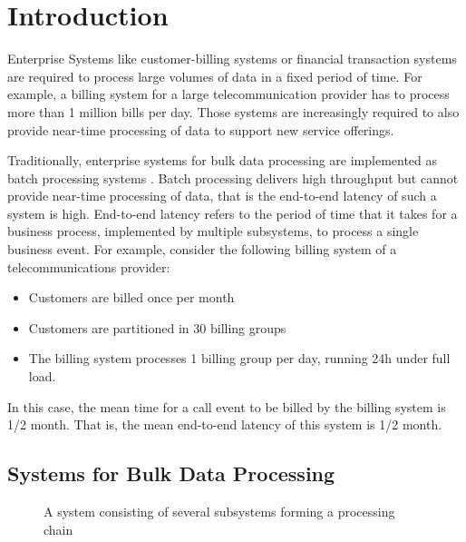 \chapter{Introduction}\label{ch:introduction}

Enterprise Systems like customer-billing systems or financial transaction systems are required to process large volumes of data in a fixed period of time. For example, a billing system for a large telecommunication provider has to process more than 1 million bills per day.
Those systems are increasingly required to also provide near-time processing of data to support new service offerings.

Traditionally, enterprise systems for bulk data processing are implemented as batch processing systems \citep{Fleck:1999aa}. Batch processing delivers high throughput but cannot provide near-time processing of data, that is the end-to-end latency of such a system is high. End-to-end latency refers to the period of time that it takes for a business process, implemented by multiple subsystems, to process a single business event.  For example, consider the following billing system of a telecommunications provider:
\begin{itemize}
	\item Customers are billed once per month
	\item Customers are partitioned in 30 billing groups
	\item The billing system processes 1 billing group per day, running 24h under full load.
\end{itemize}
In this case, the mean time for a call event to be billed by the billing system is 1/2 month. That is, the mean end-to-end latency of this system is 1/2 month.

\section{Systems for Bulk Data Processing}

\begin{figure}[h!tbp]
	\centering
	\mbox{}
	\mbox{}
	\caption{A system consisting of several subsystems forming a processing chain}
\end{figure}

